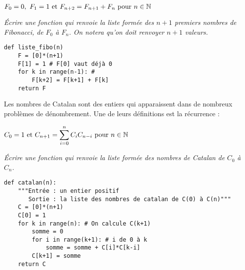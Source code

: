 \begin{center}
$F_0 = 0,\ F_1 = 1 \hbox{ et }F_{n+2} = F_{n+1} + F_n \hbox{ pour }n\in {\mathbb N}$
\end{center}
\vskip -5mm
\begin{Exercise}[title=Nombres de Fibonacci]\it
Écrire une fonction  qui renvoie la liste formée des $n+1$ premiers nombres de Fibonacci, de $F_0$ à $F_n$. On notera qu'on doit renvoyer $n+1$ valeurs.
\end{Exercise}
\begin{Answer}
\begin{lstlisting}
def liste_fibo(n)
    F = [0]*(n+1)
    F[1] = 1 # F[0] vaut déjà 0
    for k in range(n-1): # 
        F[k+2] = F[k+1] + F[k] 
    return F
\end{lstlisting}
\end{Answer}

\medskip

Les nombres de Catalan sont des entiers qui apparaissent dans de nombreux problèmes de dénombrement.
Une de leurs définitions est la récurrence :

\begin{center}
$\displaystyle C_0 = 1 \hbox{ et }C_{n+1}=\sum_{i=0}^n C_iC_{n-i}\hbox{ pour }n\in {\mathbb N}$
\end{center}
\vskip -5mm
\begin{Exercise}[title=Nombres de Catalan]\it 
Écrire une fonction  qui renvoie la liste formée des nombres de Catalan de $C_0$ à $C_n$.

\end{Exercise}
\begin{Answer}
\begin{lstlisting}
def catalan(n):
 	"""Entrée : un entier positif
 	   Sortie : la liste des nombres de catalan de C(0) à C(n)"""
    C = [0]*(n+1)
    C[0] = 1
    for k in range(n): # On calcule C(k+1)
        somme = 0
        for i in range(k+1): # i de 0 à k 
            somme = somme + C[i]*C[k-i] 
        C[k+1] = somme 
    return C
\end{lstlisting}
\end{Answer}
\medskip


